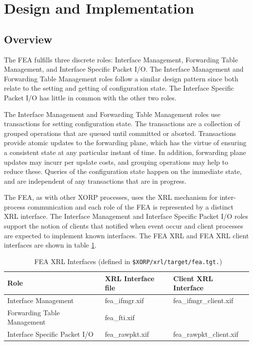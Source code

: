 \documentclass[11pt]{article}
\begin{document}
\section{Design and Implementation}

\subsection{Overview}

The FEA fulfills three discrete roles: Interface Management, Forwarding
Table Management, and Interface Specific Packet I/O.  The Interface
Management and Forwarding Table Management roles follow a similar
design pattern since both relate to the setting and getting of
configuration state.  The Interface Specific Packet I/O has little in
common with the other two roles.  

The Interface Management and Forwarding Table Management roles use
transactions for setting configuration state.  The transactions are a
collection of grouped operations that are queued until committed or
aborted.  Transactions provide atomic updates to the forwarding plane,
which has the virtue of ensuring a consistent state at any particular
instant of time.  In addition, forwarding plane updates may incurr per
update costs, and grouping operations may help to reduce
these. Queries of the configuration state happen on the immediate
state, and are independent of any transactions that are in progress.

The FEA, as with other XORP processes, uses the XRL mechanism for
inter-process communication and each role of the FEA is represented by
a distinct XRL interface.  The Interface Management and Interface
Specific Packet I/O roles support the notion of clients that notified
when event occur and client processes are expected to implement known
interfaces.  The FEA XRL and FEA XRL client interfaces are shown in
table \ref{tbl:xifs}.

\begin{table}[h]
\begin{center}
\begin{tabular}{|l|l|l|}\hline
Role & XRL Interface file & Client XRL Interface\\ \hline\hline
Interface Management 		& fea\_ifmgr.xif	& fea\_ifmgr\_client.xif\\
Forwarding Table Management	& fea\_fti.xif 		& \\
Interface Specific Packet I/O	& fea\_rawpkt.xif 	& fea\_rawpkt\_client.xif\\ \hline
\end{tabular}
\caption{\label{tbl:xifs} \
	 FEA XRL Interfaces (defined in {\tt \$XORP/xrl/target/fea.tgt.}) }
\end{center}
\end{table}
\end{document}
